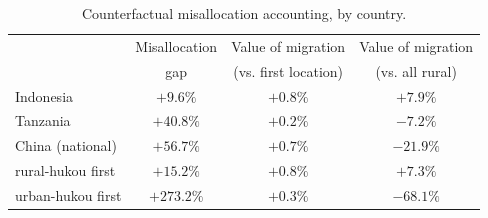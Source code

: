 \begin{table}[htbp]
\centering
\caption{Counterfactual misallocation accounting, by country.}
\label{tab:counterfactual_misallocation_varA}
\begin{tabular}{lccc}
\toprule
 & Misallocation & Value of migration & Value of migration \\
 & gap & (vs. first location) & (vs. all rural) \\
\midrule
Indonesia & $+9.6\%$ & $+0.8\%$ & $+7.9\%$ \\
Tanzania & $+40.8\%$ & $+0.2\%$ & $-7.2\%$ \\
China (national) & $+56.7\%$ & $+0.7\%$ & $-21.9\%$ \\
\quad rural-hukou first & $+15.2\%$ & $+0.8\%$ & $+7.3\%$ \\
\quad urban-hukou first & $+273.2\%$ & $+0.3\%$ & $-68.1\%$ \\
\bottomrule
\end{tabular}
\par{}
\end{table}

